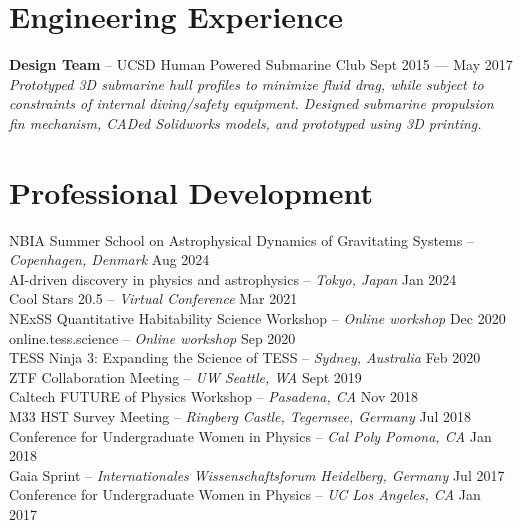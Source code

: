 \documentclass[a4,11pt]{article}
\begin{document}
\clearpage
\section{Engineering Experience}
\textbf{Design Team} -- UCSD Human Powered Submarine Club \hfill Sept 2015 --- May 2017  \\
\textsl{Prototyped 3D submarine hull profiles to minimize fluid drag, while subject to constraints of internal diving/safety equipment. Designed submarine propulsion fin mechanism, CADed Solidworks models, and prototyped using 3D printing. }

\section{Professional Development}

NBIA Summer School on Astrophysical Dynamics of Gravitating Systems -- \textit{Copenhagen, Denmark} \hfill Aug 2024 \\
AI-driven discovery in physics and astrophysics -- \textit{Tokyo, Japan} \hfill Jan 2024 \\
Cool Stars 20.5 -- \textit{Virtual Conference} \hfill Mar 2021 \\
NExSS Quantitative Habitability Science Workshop -- \textit{Online workshop} \hfill Dec 2020 \\
online.tess.science -- \textit{Online workshop} \hfill Sep 2020 \\
TESS Ninja 3: Expanding the Science of TESS -- \textit{Sydney, Australia} \hfill Feb 2020 \\
ZTF Collaboration Meeting -- \textit{UW Seattle, WA} \hfill Sept 2019 \\
Caltech FUTURE of Physics Workshop -- \textit{Pasadena, CA} \hfill Nov 2018 \\
M33 HST Survey Meeting -- \textit{Ringberg Castle, Tegernsee, Germany} \hfill Jul 2018 \\
Conference for Undergraduate Women in Physics -- \textit{Cal Poly Pomona, CA}  \hfill Jan 2018 \\
Gaia Sprint -- \textit{Internationales Wissenschaftsforum Heidelberg, Germany}  \hfill Jul 2017 \\
Conference for Undergraduate Women in Physics -- \textit{UC Los Angeles, CA}  \hfill Jan 2017 

\end{document}
